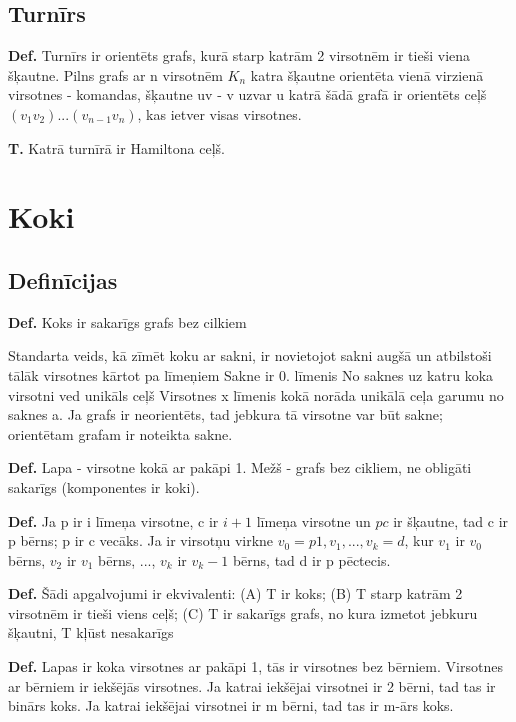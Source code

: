 \documentclass{article}
\begin{document}
\subsection{Turnīrs}

\textbf{Def.}  Turnīrs ir orientēts grafs, kurā starp katrām 2 virsotnēm ir tieši viena šķautne. Pilns grafs ar n virsotnēm $K_n$ katra šķautne orientēta vienā virzienā virsotnes - komandas, šķautne uv - v uzvar u katrā šādā grafā ir orientēts ceļš $(v_1 v_2 )...(v_{n−1} v_n )$, kas ietver visas virsotnes.

\textbf{T. } Katrā turnīrā ir Hamiltona ceļš.

\section{Koki}

\subsection{Definīcijas}

\textbf{Def.}  Koks ir sakarīgs grafs bez cilkiem

Standarta veids, kā zīmēt koku ar sakni, ir novietojot sakni augšā un atbilstoši tālāk virsotnes kārtot pa līmeņiem Sakne ir 0. līmenis No saknes uz katru koka virsotni ved unikāls ceļš Virsotnes x līmenis kokā norāda unikālā ceļa garumu no saknes a.  Ja grafs ir neorientēts, tad jebkura tā virsotne var būt sakne; orientētam grafam ir noteikta sakne.

\textbf{Def.}  Lapa - virsotne kokā ar pakāpi 1.  Mežš - grafs bez cikliem, ne obligāti sakarīgs (komponentes ir koki).

\textbf{Def.}  Ja p ir i līmeņa virsotne, c ir $i + 1$ līmeņa virsotne un $pc$ ir šķautne, tad c ir p bērns; p ir c vecāks.  Ja ir virsotņu virkne $v_0 = p1 , v_1 , ..., v_k = d$, kur $v_1$ ir $v_0$ bērns, $v_2$ ir $v_1$ bērns, ..., $v_k$ ir $v_k −1$ bērns, tad d ir p pēctecis.

\textbf{Def.}  Šādi apgalvojumi ir ekvivalenti: (A) T ir koks; (B) T starp katrām 2 virsotnēm ir tieši viens ceļš; (C) T ir sakarīgs grafs, no kura izmetot jebkuru šķautni, T kļūst nesakarīgs 


\textbf{Def.}  Lapas ir koka virsotnes ar pakāpi 1, tās ir virsotnes bez bērniem.  Virsotnes ar bērniem ir iekšējās virsotnes.  Ja katrai iekšējai virsotnei ir 2 bērni, tad tas ir binārs koks.  Ja katrai iekšējai virsotnei ir m bērni, tad tas ir m-ārs koks.
\end{document}
